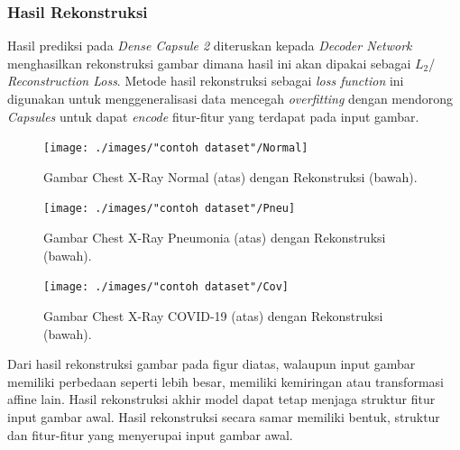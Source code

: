 \documentclass{article}
\begin{document}
   		\subsubsection{Hasil Rekonstruksi}
		\par
		Hasil prediksi pada \textit{Dense Capsule 2} diteruskan kepada \textit{Decoder Network} menghasilkan rekonstruksi gambar dimana hasil ini akan dipakai sebagai $L_{2}$/ \textit{Reconstruction Loss}. Metode hasil rekonstruksi sebagai \textit{loss function} ini digunakan untuk menggeneralisasi data mencegah \textit{overfitting} dengan mendorong \textit{Capsules} untuk dapat \textit{encode} fitur-fitur yang terdapat pada input gambar.
		\begin{figure}[H]
			\centering
			\texttt{[image: ./images/"contoh dataset"/Normal]}
			\caption{Gambar Chest X-Ray Normal (atas) dengan Rekonstruksi (bawah).}
		\end{figure}
		\begin{figure}[H]
			\centering
			\texttt{[image: ./images/"contoh dataset"/Pneu]}
			\caption{Gambar Chest X-Ray Pneumonia (atas) dengan Rekonstruksi (bawah).}
		\end{figure}
		\begin{figure}[H]
			\centering
			\texttt{[image: ./images/"contoh dataset"/Cov]}
			\caption{Gambar Chest X-Ray COVID-19 (atas) dengan Rekonstruksi (bawah).}
		\end{figure}
		\par
		Dari hasil rekonstruksi gambar pada figur diatas, walaupun input gambar memiliki perbedaan seperti lebih besar, memiliki kemiringan atau transformasi affine lain. Hasil rekonstruksi akhir model dapat tetap menjaga struktur fitur input gambar awal. Hasil rekonstruksi secara samar memiliki bentuk, struktur dan fitur-fitur yang menyerupai input gambar awal.
   \newpage
\end{document}
